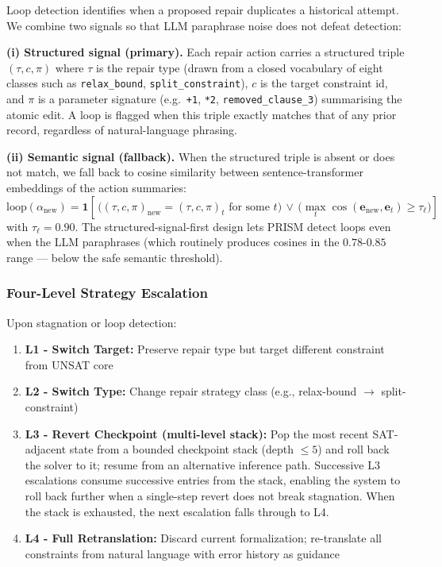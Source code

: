Loop detection identifies when a proposed repair duplicates a historical attempt. We combine two signals so that LLM paraphrase noise does not defeat detection:

\textbf{(i) Structured signal (primary).} Each repair action carries a structured triple $(\tau, c, \pi)$ where $\tau$ is the repair type (drawn from a closed vocabulary of eight classes such as \texttt{relax\_bound}, \texttt{split\_constraint}), $c$ is the target constraint id, and $\pi$ is a parameter signature (e.g.\ \texttt{+1}, \texttt{*2}, \texttt{removed\_clause\_3}) summarising the atomic edit. A loop is flagged when this triple exactly matches that of any prior record, regardless of natural-language phrasing.

\textbf{(ii) Semantic signal (fallback).} When the structured triple is absent or does not match, we fall back to cosine similarity between sentence-transformer embeddings of the action summaries:
$$\text{loop}(\alpha_{\text{new}}) = \mathbf{1}\!\left[\,\big((\tau, c, \pi)_{\text{new}} = (\tau, c, \pi)_t \text{ for some } t\big)\,\vee\,\big(\max_t \cos(\mathbf{e}_{\text{new}}, \mathbf{e}_t) \geq \tau_\ell\big)\right]$$
with $\tau_\ell = 0.90$. The structured-signal-first design lets PRISM detect loops even when the LLM paraphrases (which routinely produces cosines in the $0.78\text{-}0.85$ range — below the safe semantic threshold).

\subsubsection{Four-Level Strategy Escalation}

Upon stagnation or loop detection:
\begin{enumerate}
    \item \textbf{L1 - Switch Target:} Preserve repair type but target different constraint from UNSAT core
    \item \textbf{L2 - Switch Type:} Change repair strategy class (e.g., relax-bound $\to$ split-constraint)
    \item \textbf{L3 - Revert Checkpoint (multi-level stack):} Pop the most recent SAT-adjacent state from a bounded checkpoint stack (depth $\leq 5$) and roll back the solver to it; resume from an alternative inference path. Successive L3 escalations consume successive entries from the stack, enabling the system to roll back further when a single-step revert does not break stagnation. When the stack is exhausted, the next escalation falls through to L4.
    \item \textbf{L4 - Full Retranslation:} Discard current formalization; re-translate all constraints from natural language with error history as guidance
\end{enumerate}

